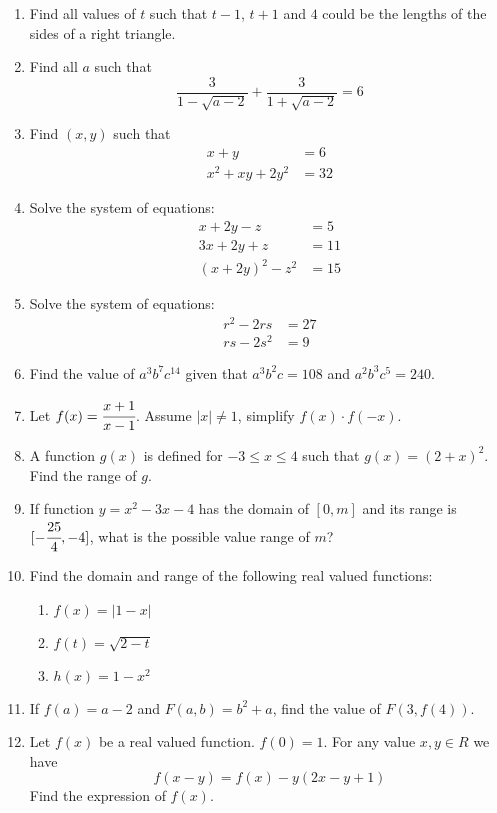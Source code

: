 \documentclass[letterpaper,12pt]{article}
\author{Shawn Ma}
\date{\today}
\begin{document}
\setlength{\parindent}{0pt}
\begin{enumerate}
    \item Find all values of $t$ such that $t-1$, $t+1$ and $4$ 
    could be the lengths of the sides of a right triangle.
    \item Find all $a$ such that
    \[\frac{3}{1-\sqrt{a-2}}+\frac{3}{1+\sqrt{a-2}}=6\]
    \item Find $(x,y)$ such that \begin{align*}
        x+y &=6 \\
        x^2+xy+2y^2&=32
         \end{align*}
    \item Solve the system of equations: \begin{align*}
    x+2y-z&=5\\
    3x+2y+z&=11\\
    (x+2y)^2-z^2&=15
    \end{align*}
    \item Solve the system of equations: \begin{align*}
        r^2-2rs&=27\\
        rs-2s^2&=9
        \end{align*}
    \item Find the value of $a^3b^7c^{14}$ given that $a^3b^2c=108$ and $a^2b^3c^5=240$.
    \item Let $f(x)=\cfrac{x+1}{x-1}$. Assume $|x|\neq{1}$, simplify $f(x)\cdot f(-x)$.
    \item A function $g(x)$ is defined for $-3\le x\le 4$ such that $g(x)=(2+x)^2$. Find the range of $g$.
    \item If function $y=x^2-3x-4$ has the domain of $[0,m]$ and its range is $[-\cfrac{25}{4},-4]$, what is the possible
    value range of $m$?
    \item Find the domain and range of the following real valued functions:
    \begin{enumerate}
       \item $f(x)=|1-x|$
       \item $f(t)=\sqrt{2-t}$
       \item $h(x)=1-x^2$
    \end{enumerate}
    \item If $f(a)=a-2$ and $F(a,b)=b^2+a$, find the value of $F(3,f(4))$.
    \item Let $f(x)$ be a real valued function. $f(0)=1$. For any value $x,y\in R$ we have \[
    f(x-y)=f(x)-y(2x-y+1)\] Find the expression of $f(x)$.

\end{enumerate}
\end{document}
